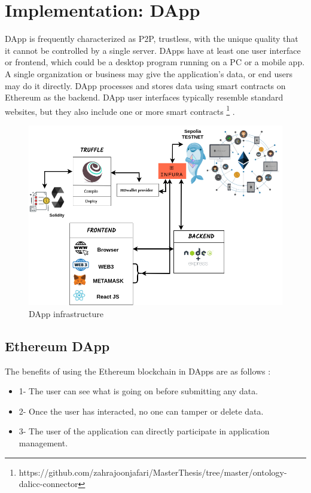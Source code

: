 \chapter{Implementation: DApp}
DApp is frequently characterized as P2P, trustless, with the unique quality that it cannot be controlled by a single server. DApps have at least one user interface or frontend, which could be a desktop program running on a PC or a mobile app.
A single organization or business may give the application's data, or end users may do it directly.
DApp processes and stores data using smart contracts on Ethereum as the backend. DApp user interfaces typically resemble standard websites, but they also include one or more smart contracts \footnote{https://github.com/zahrajoonjafari/MasterThesis/tree/master/ontology-dalicc-connector} \cite{William}.


\begin{center}
	
	\begin{figure}[htb!]
		
		\begin{minipage}{0.75\linewidth}
			
			\includegraphics[width=1.45\textwidth]{images/chap03_dapp.png}
		\end{minipage}
		\caption{DApp infrastructure}
		
	\end{figure}
	
\end{center}

\section{Ethereum DApp}
The benefits of using the Ethereum blockchain in DApps are as follows \cite{William}:
\begin{itemize}
    \item 1- The user can see what is going on before submitting any data.
    \item 2- Once the user has interacted, no one can tamper or delete data.
    \item 3- The user of the application can directly participate in application management.
\end{itemize}
